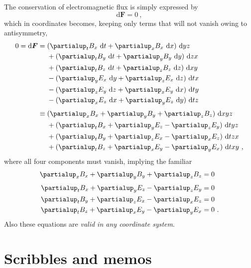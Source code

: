 \documentclass[\ifafour a4paper,12pt,\else a5paper,10pt,\fi%
onecolumn,oneside,article,%
british%
]{memoir}
\theoremstyle{remark}
\theoremstyle{innote}
\newcommand*{\de}{\partialup}%
\newcommand*{\di}{\mathrm{d}}%
\renewcommand*{\|}[1][]{\nonscript\:#1\vert\nonscript\:\mathopen{}}
\begin{document}
The conservation of electromagnetic flux is simply expressed by
\begin{equation}
  \label{eq:cons_EM}
  \di \bm{F} = 0 \ ,
\end{equation}
which in coordinates becomes, keeping only terms that will not vanish owing to antisymmetry,
\begin{equation}
  \label{eq:cons_EM_coords}
  \begin{split}
    0 = \di\bm{F} &=
    \!\begin{aligned}[t]
     & (\de_{t}B_{x}\ \di t + \de_{x}B_{x}\ \di x)\ \di yz\\
    &{}+ (\de_{t}B_{y}\ \di t + \de_{y}B_{y}\ \di y)\ \di zx\\
    &{}+  (\de_{t}B_{z}\ \di t + \de_{z}B_{z}\ \di z)\ \di xy\\
    &{}- (\de_{y}E_{x}\ \di y + \de_{z}E_{x}\ \di z)\ \di tx\\
    &{}- (\de_{z}E_{y}\ \di z + \de_{x}E_{y}\ \di x)\ \di ty\\
    &{}- (\de_{x}E_{z}\ \di x + \de_{y}E_{z}\ \di y)\ \di tz
    \end{aligned}
  \\[\jot]
  &\equiv
  \!\begin{aligned}[t]
&(\de_{x}B_{x} + \de_{y}B_{y} + \de_{z}B_{z})\ \di xyz \\
  &{}+ (\de_{t}B_{x} + \de_{y}E_{z} - \de_{z}E_{y})\ \di tyz \\
  &{}+ (\de_{t}B_{y} + \de_{z}E_{x} - \de_{x}E_{z})\ \di tzx \\
  &{}+ (\de_{t}B_{z} + \de_{x}E_{y} - \de_{y}E_{x})\ \di txy \ ,
\end{aligned}
  \end{split}
\end{equation}
where all four components must vanish, implying the familiar
\begin{equation}
  \label{eq:cons_EM_familiar}
  \begin{aligned}
    \de_{x}B_{x} + \de_{y}B_{y} + \de_{z}B_{z} &= 0 \\[\jot]
  \de_{t}B_{x} + \de_{y}E_{z} - \de_{z}E_{y} &=0 \\
  \de_{t}B_{y} + \de_{z}E_{x} - \de_{x}E_{z} &=0 \\
  \de_{t}B_{z} + \de_{x}E_{y} - \de_{y}E_{x} &=0 \ .
\end{aligned}
\end{equation}
Also these equations are \emph{valid in any coordinate system}.

\section{Scribbles and memos}
\label{sec:memos}
\end{document}

